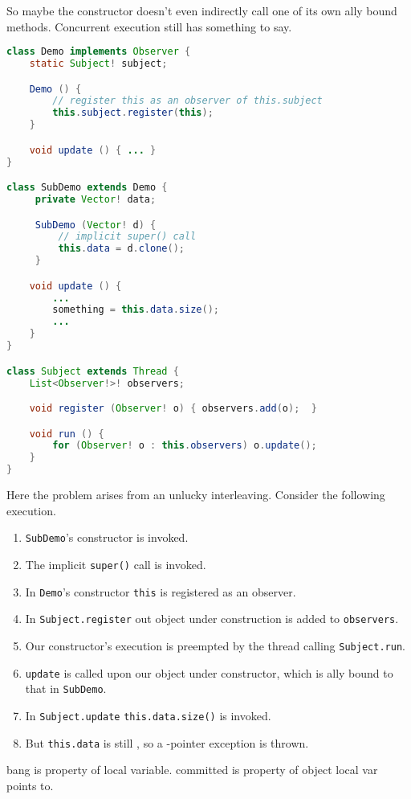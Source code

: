 \documentclass{article}
\begin{document}
\begin{example}
  So maybe the constructor doesn't even indirectly call one of its own \dynamic{}ally bound methods.
  Concurrent execution still has something to say.
\begin{lstlisting}[language=Java]
class Demo implements Observer {
    static Subject! subject;

    Demo () {
        // register this as an observer of this.subject
        this.subject.register(this);
    }

    void update () { ... }
}

class SubDemo extends Demo {
     private Vector! data;

     SubDemo (Vector! d) {
         // implicit super() call
         this.data = d.clone();
     }

    void update () {
        ...
        something = this.data.size();
        ...
    }
}

class Subject extends Thread {
    List<Observer!>! observers;

    void register (Observer! o) { observers.add(o);  }

    void run () {
        for (Observer! o : this.observers) o.update();
    }
}
\end{lstlisting}
  Here the problem arises from an unlucky interleaving.
  Consider the following execution.
  \begin{enumerate}
  \item \texttt{SubDemo}'s constructor is invoked.
  \item The implicit \texttt{super()} call is invoked.
  \item In \texttt{Demo}'s constructor \texttt{this} is registered as an observer.
  \item In \texttt{Subject.register} out object under construction is added to \texttt{observers}.
  \item Our constructor's execution is preempted by the thread calling \texttt{Subject.run}.
  \item \texttt{update} is called upon our object under constructor, which is \dyanamic{}ally bound to that in \texttt{SubDemo}.
  \item In \texttt{Subject.update} \texttt{this.data.size()} is invoked.
  \item But \texttt{this.data} is still \cringe{}, so a \cringe{}-pointer exception is thrown.
  \end{enumerate}
\end{example}

\vspace{1cm}

bang is property of local variable.
committed is property of object local var points to.
\end{document}
